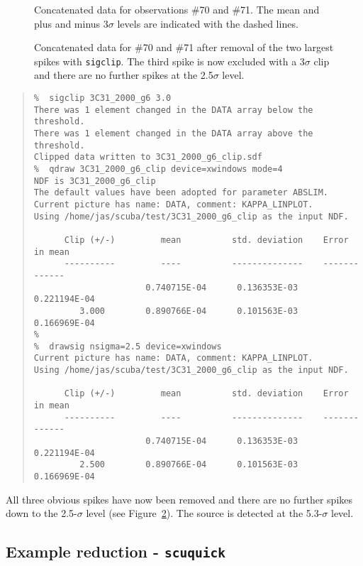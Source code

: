 \documentclass[twoside,11pt,fleqn]{article}
\newenvironment{myquote}{\begin{quote}\begin{small}}{\end{small}\end{quote}}
\begin{document}
\begin{figure}
\caption{Concatenated data for observations \#70 and \#71. The
mean and plus and minus 3$\sigma$ levels are indicated with the dashed
lines.}
\label{f1}
\end{figure}

\begin{figure}
\caption{Concatenated data for \#70 and \#71 after removal of the
two largest spikes with {\tt sigclip}. The third spike is now excluded
with a 3$\sigma$ clip and there are no further spikes at the 2.5$\sigma$ level.}
\label{f2}
\end{figure}

\begin{myquote}
\begin{verbatim}
%  sigclip 3C31_2000_g6 3.0
There was 1 element changed in the DATA array below the threshold.
There was 1 element changed in the DATA array above the threshold.
Clipped data written to 3C31_2000_g6_clip.sdf
%  qdraw 3C31_2000_g6_clip device=xwindows mode=4
NDF is 3C31_2000_g6_clip
The default values have been adopted for parameter ABSLIM.
Current picture has name: DATA, comment: KAPPA_LINPLOT.
Using /home/jas/scuba/test/3C31_2000_g6_clip as the input NDF.
 
      Clip (+/-)         mean          std. deviation    Error in mean
      ----------         ----          --------------    -------------
                      0.740715E-04      0.136353E-03      0.221194E-04
         3.000        0.890766E-04      0.101563E-03      0.166969E-04
% 
%  drawsig nsigma=2.5 device=xwindows
Current picture has name: DATA, comment: KAPPA_LINPLOT.
Using /home/jas/scuba/test/3C31_2000_g6_clip as the input NDF.
 
      Clip (+/-)         mean          std. deviation    Error in mean
      ----------         ----          --------------    -------------
                      0.740715E-04      0.136353E-03      0.221194E-04
         2.500        0.890766E-04      0.101563E-03      0.166969E-04
\end{verbatim}
\end{myquote}

All three obvious spikes have now been removed and there are no
further spikes down to the 2.5-$\sigma$ level (see Figure~\ref{f2}). The source
is detected at the 5.3-$\sigma$ level.

\subsection{Example reduction - {\tt scuquick}}
\end{document}
